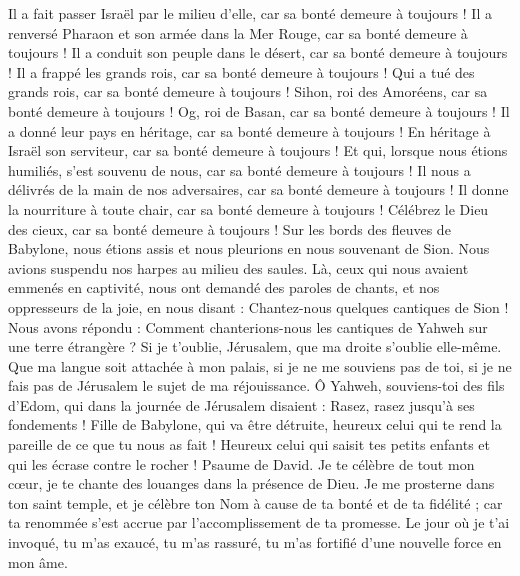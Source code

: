 \begin{multicols}{2}
Il a fait passer Israël par le milieu d'elle, car sa bonté demeure à toujours !
Il a renversé Pharaon et son armée dans la Mer Rouge, car sa bonté demeure à toujours !
Il a conduit son peuple dans le désert, car sa bonté demeure à toujours !
Il a frappé les grands rois, car sa bonté demeure à toujours !
Qui a tué des grands rois, car sa bonté demeure à toujours !
Sihon, roi des Amoréens, car sa bonté demeure à toujours !
Og, roi de Basan, car sa bonté demeure à toujours !
Il a donné leur pays en héritage, car sa bonté demeure à toujours !
En héritage à Israël son serviteur, car sa bonté demeure à toujours !
Et qui, lorsque nous étions humiliés, s'est souvenu de nous, car sa bonté demeure à toujours !
Il nous a délivrés de la main de nos adversaires, car sa bonté demeure à toujours !
Il donne la nourriture à toute chair, car sa bonté demeure à toujours !
Célébrez le Dieu des cieux, car sa bonté demeure à toujours !
\VerseOne{}Sur les bords des fleuves de Babylone, nous étions assis et nous pleurions en nous souvenant de Sion.
Nous avions suspendu nos harpes au milieu des saules.
Là, ceux qui nous avaient emmenés en captivité, nous ont demandé des paroles de chants, et nos oppresseurs de la joie, en nous disant : Chantez-nous quelques cantiques de Sion ! Nous avons répondu :
Comment chanterions-nous les cantiques de Yahweh sur une terre étrangère ?
Si je t'oublie, Jérusalem, que ma droite s'oublie elle-même.
Que ma langue soit attachée à mon palais, si je ne me souviens pas de toi, si je ne fais pas de Jérusalem le sujet de ma réjouissance.
Ô Yahweh, souviens-toi des fils d'Edom, qui dans la journée de Jérusalem disaient : Rasez, rasez jusqu'à ses fondements !
Fille de Babylone, qui va être détruite, heureux celui qui te rend la pareille de ce que tu nous as fait !
Heureux celui qui saisit tes petits enfants et qui les écrase contre le rocher !
\VerseOne{}Psaume de David. Je te célèbre de tout mon cœur, je te chante des louanges dans la présence de Dieu.
Je me prosterne dans ton saint temple, et je célèbre ton Nom à cause de ta bonté et de ta fidélité ; car ta renommée s'est accrue par l'accomplissement de ta promesse.
Le jour où je t'ai invoqué, tu m'as exaucé, tu m'as rassuré, tu m'as fortifié d'une nouvelle force en mon âme.

\end{multicols}
